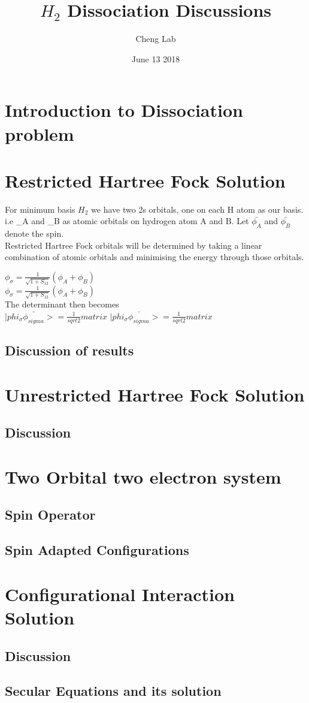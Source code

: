 \documentclass[11pt]{article}   	%
\begin{document}
\title{$H_2$ Dissociation Discussions}
\author{Cheng Lab}
\date{June 13 2018}							%
\maketitle
\section{Introduction to Dissociation problem}
\section{Restricted Hartree Fock Solution}
	For minimum basis $H_2$ we have two 2s orbitals, one on each H atom as our basis.
	i.e \phi_A and \psi_B as atomic orbitals on hydrogen atom A and B. Let $\bar{\phi_A}$ and $\bar{\phi_B}$
	denote the \beta spin. \\
	Restricted Hartree Fock orbitals will be determined by taking a linear combination of atomic orbitals and minimising the energy through those orbitals. 

	$\phi_{\sigma}=\frac{1}{\sqrt{1+S_{12}}}(\phi_A+\phi_B)$\\	
	$\phi_{\sigma}=\frac{1}{\sqrt{1+S_{12}}}(\phi_A+\phi_B)$\\
	The determinant then becomes \\

	$|phi_{\sigma}\bar{\phi_{sigma}}>=\frac{1}{sqrt{2}}matrix$
	$|phi_{\sigma}\bar{\phi_{sigma}}>=\frac{1}{sqrt{2}}matrix$
		
	\subsection{Discussion of results}
\section{Unrestricted Hartree Fock Solution}
	\subsection{Discussion}
\section{Two Orbital two electron system}%
	\subsection{Spin Operator}
	\subsection{Spin Adapted Configurations}
\section{Configurational Interaction Solution}
	\subsection{Discussion}
	\subsection{Secular Equations and its solution}
\end{document}
